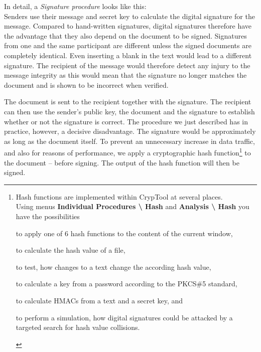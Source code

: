 In detail, a  {\em Signature procedure} looks like
this: \\ Senders use their message and secret key to calculate the digital
signature for the message. Compared to hand-written signatures, digital
signatures therefore have the advantage that they also depend on the document to
be signed. Signatures from one and the same participant are different unless the
signed documents are completely identical. Even inserting a blank in the text
would lead to a different signature. The recipient of the message would
therefore detect any injury to the message integrity as this would mean that the
signature no longer matches the document and is shown to be incorrect when
verified.

The document is sent to the recipient together with the signature. The recipient
can then use the sender's public key, the document and the signature to
establish whether or not the signature is correct. The procedure we just described
has in practice, however, a decisive disadvantage. The signature would be
approximately as long as the document itself. To prevent an unnecessary increase
in data traffic, and also for reasons of performance, we apply
a cryptographic hash function\footnote{%
Hash functions are implemented within 
CrypTool at several places.\\
Using menus {\bf Individual Procedures \textbackslash{} Hash} and
            {\bf Analysis \textbackslash{} Hash}
you have the possibilities
\begin{list}{\textbullet}{\addtolength{\itemsep}{-1.0\baselineskip}}
\item to apply one of 6 hash functions to the content of the current window, \\
\item to calculate the hash value of a file, \\
\item to test, how changes to a text change the according hash value,\\
\item to calculate a key from a password according to the PKCS\#5 
      standard, \\
\item to calculate HMACs from a text and a secret key, and\\
\item to perform a simulation, how digital signatures could be attacked 
      by a targeted search for hash value collisions.
\end{list}
} to the document -- before signing. The output of the hash function will 
then be signed.



